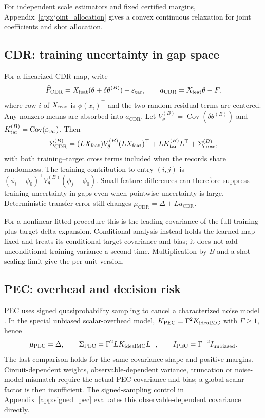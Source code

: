 \documentclass[a4paper,onecolumn,unpublished,nopdfoutputerror]{quantumarticle}
\theoremstyle{plain}
\theoremstyle{definition}
\newcommand{\Cov}{\operatorname{Cov}}
\newcommand{\CDR}{\mathrm{CDR}}
\newcommand{\PEC}{\mathrm{PEC}}
\newcommand{\1}{\mathbf{1}}
\begin{document}
For independent scale estimators and fixed certified margins, Appendix~\ref{app:joint_allocation} gives a convex continuous relaxation for joint coefficients and shot allocation.


\subsection{CDR: training uncertainty in gap space}
\label{sec:cdr_signature}
For a linearized CDR map, write
\[
\widehat F_{\CDR}=X_{\rm feat}(\theta+\delta\theta^{(B)})+\varepsilon_{\rm tar},
\qquad a_{\CDR}=X_{\rm feat}\theta-F,
\]
where row $i$ of $X_{\rm feat}$ is $\phi(x_i)^\top$ and the two random residual terms are centered. Any nonzero means are absorbed into $a_{\CDR}$. Let $V_\theta^{(B)}=\Cov(\delta\theta^{(B)})$ and $K_{\rm tar}^{(B)}=\Cov(\varepsilon_{\rm tar})$. Then
\begin{equation}
\Sigma_{\CDR}^{(B)}=(LX_{\rm feat})V_\theta^{(B)}(LX_{\rm feat})^\top
+LK_{\rm tar}^{(B)}L^\top+\Sigma_{\rm cross}^{(B)},
\end{equation}
with both training--target cross terms included when the records share randomness. The training contribution to entry $(i,j)$ is $(\phi_i-\phi_0)^\top V_\theta^{(B)}(\phi_j-\phi_0)$. Small feature differences can therefore suppress training uncertainty in gaps even when pointwise uncertainty is large. Deterministic transfer error still changes $\mu_{\CDR}=\Delta+La_{\CDR}$.

For a nonlinear fitted procedure this is the leading covariance of the full training-plus-target delta expansion. Conditional analysis instead holds the learned map fixed and treats its conditional target covariance and bias; it does not add unconditional training variance a second time. Multiplication by $B$ and a shot-scaling limit give the per-unit version.

\subsection{PEC: overhead and decision risk}
\label{sec:pec_signature}
PEC uses signed quasiprobability sampling to cancel a characterized noise model \cite{vandenBerg2023}. In the special unbiased scalar-overhead model, $K_{\PEC}=\Gamma^2K_{\rm idealMC}$ with $\Gamma\ge1$, hence
\begin{equation}
\mu_{\PEC}=\Delta,\qquad
\Sigma_{\PEC}=\Gamma^2LK_{\rm idealMC}L^\top,
\qquad I_{\PEC}=\Gamma^{-2}I_{\rm unbiased}.
\end{equation}
The last comparison holds for the same covariance shape and positive margins. Circuit-dependent weights, observable-dependent variance, truncation or noise-model mismatch require the actual PEC covariance and bias; a global scalar factor is then insufficient. The signed-sampling control in Appendix~\ref{app:signed_pec} evaluates this observable-dependent covariance directly.
\end{document}
